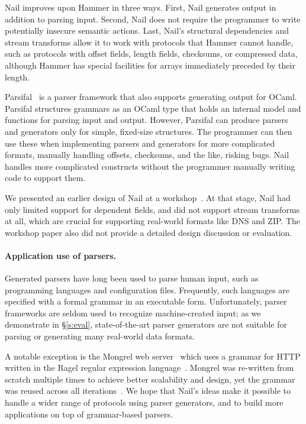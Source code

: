 Nail improves upon Hammer in three ways.  First, Nail generates output in
addition to parsing input.  Second, Nail does not require the programmer
to write potentially insecure semantic actions.  Last, Nail's structural
dependencies and stream transforms allow it to work with protocols that
Hammer cannot handle, such as protocols with offset fields, length fields,
checksums, or compressed data, although Hammer has special facilities for
arrays immediately preceded by their length.

Parsifal~\cite{ANSSI:parsifal} is a parser framework that also supports
generating output for OCaml.  Parsifal structures grammars as an OCaml
type that holds an internal model and functions for parsing input and
output.  However, Parsifal can produce parsers and generators
only for simple, fixed-size structures.  The programmer can then use
these when implementing parsers and generators for more complicated
formats, manually handling offsets, checksums, and the like, risking bugs.
Nail handles more complicated constructs without the programmer manually
writing code to support them.

We presented an earlier design of Nail at a
workshop~\cite{bangert:nail-langsec-anon}.  At that stage, Nail had only
limited support for dependent fields, and did not support stream
transforms at all, which are crucial for supporting real-world formats
like DNS and ZIP\@.  The workshop paper also did not provide a detailed
design discussion or evaluation.


\paragraph{Application use of parsers.}

Generated parsers have long been used to parse human input, such
as programming languages and configuration files. Frequently, such
languages are specified with a formal grammar in an executable
form. Unfortunately, parser frameworks are seldom used to recognize
machine-created input; as we demonstrate in \S\ref{s:eval},
state-of-the-art parser generators are not suitable for parsing or
generating many real-world data formats.

A notable exception is the Mongrel web server~\cite{mongrel} which
uses a grammar for HTTP written in the Ragel regular expression
language~\cite{ragel-paper}.  Mongrel was re-written from scratch
multiple times to achieve better scalability and design, yet the
grammar was reused across all iterations~\cite{patterson-citation}.
We hope that Nail's ideas make it possible to handle a wider range of
protocols using parser generators, and to build more applications on
top of grammar-based parsers.


